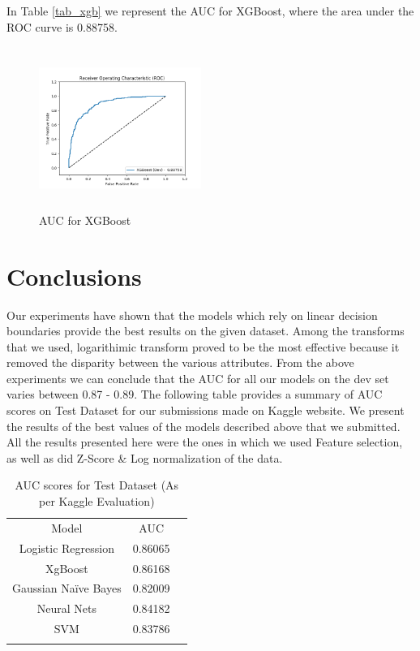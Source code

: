 \documentclass[conference]{IEEEtran}
\numberwithin{equation}{section}
\numberwithin{figure}{section}
\numberwithin{table}{section}
\begin{document}
In Table \ref{tab_xgb} we represent the AUC for XGBoost, where the area under the ROC curve is 0.88758.
 
\begin{figure}
\centering
  \includegraphics[width=200px, height = 200px]{xgboost_dev}
  \caption{AUC for XGBoost}
  \label{xgboost_fig}
\end{figure}

\section{Conclusions}
Our experiments have shown that the models which rely on linear decision boundaries provide the best results on the given dataset. Among the transforms that we used, logarithimic transform proved to be the most effective because it removed the disparity between the various attributes. From the above experiments we can conclude that the AUC for all our models on the dev set varies between 0.87 - 0.89.
The following table provides a summary of AUC scores on Test Dataset for our submissions made on Kaggle website. We present the results of the best values of the models described above that we submitted. All the results presented here were the ones in which we used Feature selection, as well as did Z-Score \& Log normalization of the data.
\begin{table}[!htb]
\centering
\caption{AUC scores for Test Dataset (As per Kaggle Evaluation)}
\label{tab_lr}
\begin{tabular}{ c c c }
 \noalign{\smallskip}\hline\noalign{\smallskip}
   Model  & AUC \\
 \noalign{\smallskip}\hline\noalign{\smallskip}
 Logistic Regression & 0.86065\\
 XgBoost & 0.86168\\
 Gaussian Na{\"i}ve Bayes & 0.82009\\
 Neural Nets & 0.84182\\
 SVM & 0.83786 \\
 		\noalign{\smallskip}\hline\noalign{\smallskip}	
 \end{tabular}
\end{table}
\end{document}

